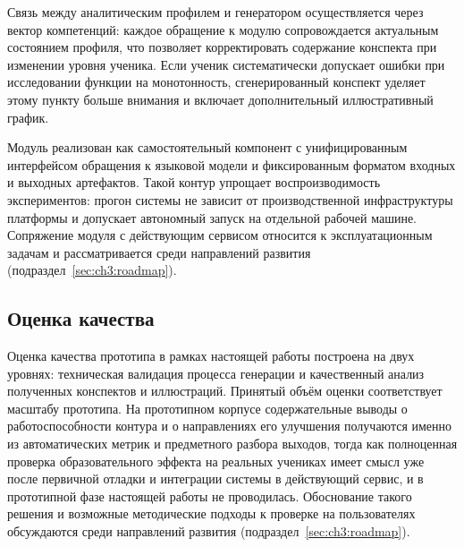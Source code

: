 Связь между аналитическим профилем и генератором осуществляется через вектор
компетенций: каждое обращение к модулю сопровождается актуальным состоянием
профиля, что позволяет корректировать содержание конспекта при изменении
уровня ученика. Если ученик систематически допускает ошибки при исследовании
функции на монотонность, сгенерированный конспект уделяет этому пункту
больше внимания и включает дополнительный иллюстративный график.

Модуль реализован как самостоятельный компонент с унифицированным интерфейсом
обращения к языковой модели и фиксированным форматом входных и выходных
артефактов. Такой контур упрощает воспроизводимость экспериментов: прогон
системы не зависит от производственной инфраструктуры платформы и допускает
автономный запуск на отдельной рабочей машине. Сопряжение модуля с
действующим сервисом относится к эксплуатационным задачам и рассматривается
среди направлений развития (подраздел~\ref{sec:ch3:roadmap}).

\subsection{Оценка качества}

Оценка качества прототипа в рамках настоящей работы построена на двух
уровнях: техническая валидация процесса генерации и качественный анализ
полученных конспектов и иллюстраций. Принятый объём оценки соответствует
масштабу прототипа. На прототипном корпусе содержательные выводы о
работоспособности контура и о направлениях его улучшения получаются именно
из автоматических метрик и предметного разбора выходов, тогда как
полноценная проверка образовательного эффекта на реальных учениках
имеет смысл уже после первичной отладки и интеграции системы в действующий
сервис, и в прототипной фазе настоящей работы не проводилась. Обоснование
такого решения и возможные методические подходы к проверке на пользователях
обсуждаются среди направлений развития (подраздел~\ref{sec:ch3:roadmap}).

